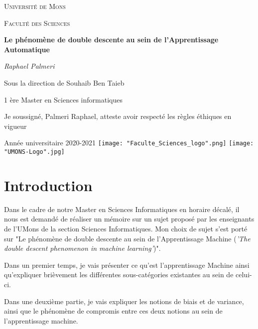 \documentclass[a4paper]{article}
\author{Raphael Palmeri\\1 ère Master en Sciences Informatiques\\ 2020-2021}
\begin{document}
\begin{titlepage}
	\centering
	{\scshape\LARGE Université de Mons \par}
	\vspace{1cm}
	{\scshape\large Faculté des Sciences \par}
	\vspace{1.5cm}
	{\huge\bfseries Le phénomène de double descente au sein de l'Apprentissage Automatique \par}
	\vspace{2cm}
	{\Large\itshape Raphael Palmeri \par}
	\vspace{2.0cm}
	{Sous la direction de Souhaib Ben Taieb \par}
	\vspace{1.0cm}
	{1 ère Master en Sciences informatiques \par}
	\vspace{0.5cm}
	{Je soussigné, Palmeri Raphael, atteste avoir respecté les règles éthiques en vigueur \par}
	\vspace{4cm}
	Année universitaire 2020-2021
	\vfill
	\texttt{[image: "Faculte\_Sciences\_logo".png]}
	\hfill
	\texttt{[image: "UMONS-Logo".jpg]}
\end{titlepage}
\newpage
\thispagestyle{empty}
\mbox{}
\newpage

\tableofcontents
\newpage

\section{Introduction}
Dans le cadre de notre Master en Sciences Informatiques en horaire décalé, il nous est demandé de réaliser un mémoire sur un sujet proposé par les enseignants de l'UMons de la section Sciences Informatiques. Mon choix de sujet s'est porté sur "Le phénomène de double descente au sein de l'Apprentissage Machine (\textit{'The double descent phenomenon in machine learning'})".\newline

Dans un premier temps, je vais présenter ce qu'est l'apprentissage Machine ainsi qu'expliquer brièvement les différentes sous-catégories existantes au sein de celui-ci. \newline

Dans une deuxième partie, je vais expliquer les notions de biais et de variance, ainsi que le phénomène de compromis entre ces deux notions au sein de l'apprentissage machine. \newline
\end{document}
